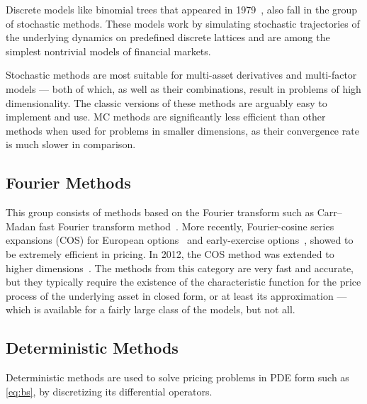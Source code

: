\documentclass{UUThesisTemplate}
\begin{document}
\par
Discrete models like binomial trees that appeared in 1979~\cite{cox1979option, rendleman1979two}, also fall in the group of stochastic methods. These models work by simulating stochastic trajectories of the underlying dynamics on predefined discrete lattices and are among the simplest nontrivial models of financial markets. 

\par
Stochastic methods are most suitable for multi-asset derivatives and multi-factor models --- both of which, as well as their combinations, result in problems of high dimensionality. The classic versions of these methods are arguably easy to implement and use. MC methods are significantly less efficient than other methods when used for problems in smaller dimensions, as their convergence rate is much slower in comparison.
%



%
\subsection{Fourier Methods}

\par
This group consists of methods based on the Fourier transform such as Carr--Madan fast Fourier transform method~\cite{carr1999option}. More recently, Fourier-cosine series expansions (COS) for European options~\cite{fang2008novel} and early-exercise options~\cite{fang2009pricing}, showed to be extremely efficient in pricing. In 2012, the COS method was extended to higher dimensions~\cite{ruijter2012two}. The methods from this category are very fast and accurate, but they typically require the existence of the characteristic function for the price process of the underlying asset in closed form, or at least its approximation --- which is available for a fairly large class of the models, but not all. 
%



%
\subsection{Deterministic Methods}

\par
Deterministic methods are used to solve pricing problems in PDE form such as \eqref{eq:bs}, by discretizing its differential operators. 
\end{document}
